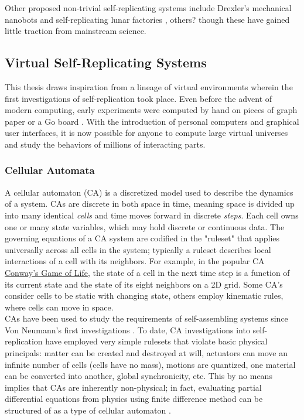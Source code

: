 {Other proposed non-trivial self-replicating systems include Drexler's mechanical nanobots  \cite{} and self-replicating lunar factories \cite{}, others? though these have gained little traction from mainstream science.


\subsection{Virtual Self-Replicating Systems}

This thesis draws inspiration from a lineage of virtual environments wherein the first investigations of self-replication took place.  Even before the advent of modern computing, early experiments were computed by hand on pieces of graph paper or a Go board \cite{Gardner1970}.  With the introduction of personal computers and graphical user interfaces, it is now possible for anyone to compute large virtual universes and study the behaviors of millions of interacting parts.

\subsubsection{Cellular Automata}

A cellular automaton (CA) is a discretized model used to describe the dynamics of a system.  CAs are discrete in both space in time, meaning space is divided up into many identical \textit{cells} and time moves forward in discrete \textit{steps}.  Each cell owns one or many state variables, which may hold discrete or continuous data.  The governing equations of a CA system are codified in the "ruleset" that applies universally across all cells in the system; typically a ruleset describes local interactions of a cell with its neighbors.  For example, in the popular CA \href{https://en.wikipedia.org/wiki/Conway's_Game_of_Life}{Conway's Game of Life}, the state of a cell in the next time step is a function of its current state and the state of its eight neighbors on a 2D grid.  Some CA's consider cells to be static with changing state, others employ kinematic rules, where cells can move in space.\\

CAs have been used to study the requirements of self-assembling systems since Von Neumann's first investigations \cite{Neumann1966}.  To date, CA investigations into self-replication have employed very simple rulesets that violate basic physical principals: matter can be created and destroyed at will, actuators can move an infinite number of cells (cells have no mass), motions are quantized, one material can be converted into another, global synchronicity, etc.  This by no means implies that CAs are inherently non-physical; in fact, evaluating partial differential equations from physics using finite difference method can be structured of as a type of cellular automaton \cite{Yang2010}.

}
